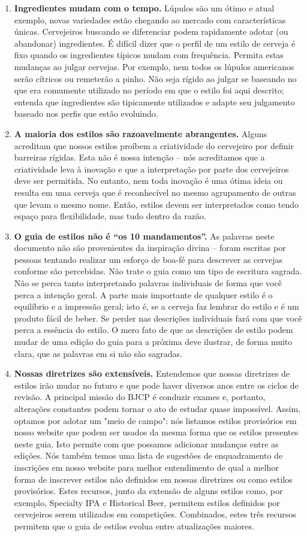 \begin{enumerate}
\item \textbf{Ingredientes mudam com o tempo.} Lúpulos são um ótimo e atual exemplo, novas variedades estão chegando ao mercado com características únicas. Cervejeiros buscando se diferenciar podem rapidamente adotar (ou abandonar) ingredientes. É difícil dizer que o perfil de um estilo de cerveja é fixo quando os ingredientes típicos mudam com frequência. Permita estas mudanças ao julgar cervejas. Por exemplo, nem todos os lúpulos americanos serão cítricos ou remeterão a pinho. Não seja rígido ao julgar se baseando no que era comumente utilizado no período em que o estilo foi aqui descrito; entenda que ingredientes são tipicamente utilizados e adapte seu julgamento baseado nos perfis que estão evoluindo.
\item \textbf{A maioria dos estilos são razoavelmente abrangentes.} Alguns acreditam que nossos estilos proíbem a criatividade do cervejeiro por definir barreiras rígidas. Esta não é nossa intenção – nós acreditamos que a criatividade leva à inovação e que a interpretação por parte dos cervejeiros deve ser permitida. No entanto, nem toda inovação é uma ótima ideia ou resulta em uma cerveja que é reconhecível no mesmo agrupamento de outras que levam o mesmo nome. Então, estilos devem ser interpretados como tendo espaço para flexibilidade, mas tudo dentro da razão.
\item \textbf{O guia de estilos não é “os 10 mandamentos”.} As palavras neste documento não são provenientes da inspiração divina – foram escritas por pessoas tentando realizar um esforço de boa-fé para descrever as cervejas conforme são percebidas. Não trate o guia como um tipo de escritura sagrada. Não se perca tanto interpretando palavras individuais de forma que você perca a intenção geral. A parte mais importante de qualquer estilo é o equilíbrio e a impressão geral; isto é, se a cerveja faz lembrar do estilo e é um produto fácil de beber. Se perder nas descrições individuais fará com que você perca a essência do estilo. O mero fato de que as descrições de estilo podem mudar de uma edição do guia para a próxima deve ilustrar, de forma muito clara, que as palavras em si não são sagradas.
\item \textbf{Nossas diretrizes são extensíveis.} Entendemos que nossas diretrizes de estilos irão mudar no futuro e que pode haver diversos anos entre os ciclos de revisão. A principal missão do BJCP é conduzir exames e, portanto, alterações constantes podem tornar o ato de estudar quase impossível. Assim, optamos por adotar um "meio de campo": nós listamos estilos provisórios em nosso website que podem ser usados da mesma forma que os estilos presentes neste guia. Isto permite com que possamos adicionar mudanças entre as edições. Nós também temos uma lista de sugestões de enquadramento de inscrições em nosso website para melhor entendimento de qual a melhor forma de inscrever estilos não definidos em nossas diretrizes ou como estilos provisórios. Estes recursos, junto da extensão de alguns estilos como, por exemplo, Specialty IPA e Historical Beer, permitem estilos definidos por cervejeiros serem utilizados em competições. Combinados, estes três recursos permitem que o guia de estilos evolua entre atualizações maiores.

\end{enumerate}
